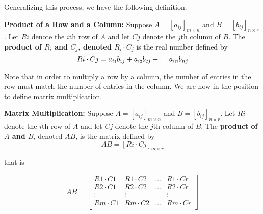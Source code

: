 Generalizing this process, we have the following definition.

\smallskip

\colorbox{ResultColor}{\bbm

\begin{defn} \label{rowcolumnproduct} \textbf{Product of a Row and a Column:}  Suppose $A = [a_{ij}]_{m \times n}$ and $B = [b_{ij}]_{n \times r}$.  Let $Ri$ denote the $i$th row of $A$ and let $Cj$ denote the $j$th column of $B$.  The  \textbf{product of \boldmath $R_{i}$ and \boldmath $C_{j}$, denoted $R_{i} \cdot C_{j}$} is the real number defined by
\[ Ri \cdot Cj = a_{i\mbox{\tiny$1$}}b_{\mbox{\tiny$1$}j} + a_{i\mbox{\tiny$2$}}b_{\mbox{\tiny$2$}j} + \ldots a_{in}b_{nj}\]

\end{defn}

\ebm}

\smallskip

Note that in order to multiply a row by a column, the number of entries in the row must match the number of entries in the column.  We are now in the position to define matrix multiplication.  

\smallskip

\colorbox{ResultColor}{\bbm

\begin{defn} \label{matrixproduct} \textbf{Matrix Multiplication:}  Suppose $A = [a_{ij}]_{m \times n}$ and $B = [b_{ij}]_{n \times r}$.  Let $Ri$ denote the $i$th row of $A$ and let $Cj$ denote the $j$th column of $B$.  The  \textbf{product of \boldmath $A$ and \boldmath $B$}, denoted $AB$, is the matrix defined by
\[AB = \left[ Ri \cdot Cj \right]_{m \times r} \]

that is

\[AB = \left[
\begin{array}{cccc} 
R1 \cdot C1 & R1 \cdot C2 & \ldots & R1 \cdot Cr \\  
R2 \cdot C1 & R2 \cdot C2 & \ldots & R2 \cdot Cr \\
   \vdots  & \vdots & & \vdots \\
Rm \cdot C1 & Rm \cdot C2 & \ldots & Rm \cdot Cr \\  \end{array} \right] \]

\end{defn}

\ebm}

\smallskip

